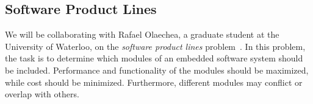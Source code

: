 \documentclass[11pt]{article}
\begin{document}
\subsection{Software Product Lines}

We will be collaborating with Rafael Olaechea, a graduate student at
the University of Waterloo, on the \textit{software product lines}
problem~\cite{ref:Olaechea12}. In this problem, the task is to
determine which modules of an embedded software system should be
included. Performance and functionality of the modules should be
maximized, while cost should be minimized. Furthermore, different
modules may conflict or overlap with others.


\printbibliography[heading=bibintoc]
\end{document}
